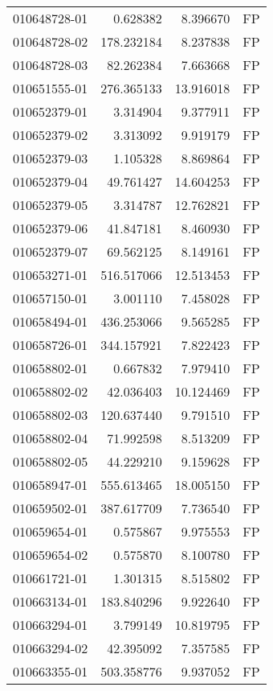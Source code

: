 \begin{tabular}{lrrl}
010648728-01 &    0.628382 &     8.396670 &   FP \\
010648728-02 &  178.232184 &     8.237838 &   FP \\
010648728-03 &   82.262384 &     7.663668 &   FP \\
010651555-01 &  276.365133 &    13.916018 &   FP \\
010652379-01 &    3.314904 &     9.377911 &   FP \\
010652379-02 &    3.313092 &     9.919179 &   FP \\
010652379-03 &    1.105328 &     8.869864 &   FP \\
010652379-04 &   49.761427 &    14.604253 &   FP \\
010652379-05 &    3.314787 &    12.762821 &   FP \\
010652379-06 &   41.847181 &     8.460930 &   FP \\
010652379-07 &   69.562125 &     8.149161 &   FP \\
010653271-01 &  516.517066 &    12.513453 &   FP \\
010657150-01 &    3.001110 &     7.458028 &   FP \\
010658494-01 &  436.253066 &     9.565285 &   FP \\
010658726-01 &  344.157921 &     7.822423 &   FP \\
010658802-01 &    0.667832 &     7.979410 &   FP \\
010658802-02 &   42.036403 &    10.124469 &   FP \\
010658802-03 &  120.637440 &     9.791510 &   FP \\
010658802-04 &   71.992598 &     8.513209 &   FP \\
010658802-05 &   44.229210 &     9.159628 &   FP \\
010658947-01 &  555.613465 &    18.005150 &   FP \\
010659502-01 &  387.617709 &     7.736540 &   FP \\
010659654-01 &    0.575867 &     9.975553 &   FP \\
010659654-02 &    0.575870 &     8.100780 &   FP \\
010661721-01 &    1.301315 &     8.515802 &   FP \\
010663134-01 &  183.840296 &     9.922640 &   FP \\
010663294-01 &    3.799149 &    10.819795 &   FP \\
010663294-02 &   42.395092 &     7.357585 &   FP \\
010663355-01 &  503.358776 &     9.937052 &   FP \\

\end{tabular}
